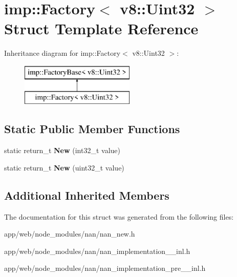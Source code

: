 \hypertarget{structimp_1_1_factory_3_01v8_1_1_uint32_01_4}{}\section{imp\+:\+:Factory$<$ v8\+:\+:Uint32 $>$ Struct Template Reference}
\label{structimp_1_1_factory_3_01v8_1_1_uint32_01_4}
Inheritance diagram for imp\+:\+:Factory$<$ v8\+:\+:Uint32 $>$\+:\begin{figure}[H]
\begin{center}
\leavevmode
\includegraphics[height=2.000000cm]{structimp_1_1_factory_3_01v8_1_1_uint32_01_4}
\end{center}
\end{figure}
\subsection*{Static Public Member Functions}
\begin{DoxyCompactItemize}
\item 
\mbox{\label{structimp_1_1_factory_3_01v8_1_1_uint32_01_4_a02e4688bceb62024264605717c05acf9}} 
static return\+\_\+t {\bfseries New} (int32\+\_\+t value)
\item 
\mbox{\label{structimp_1_1_factory_3_01v8_1_1_uint32_01_4_ac40acbbd3b18c3f7787d8215f1d740b1}} 
static return\+\_\+t {\bfseries New} (uint32\+\_\+t value)
\end{DoxyCompactItemize}
\subsection*{Additional Inherited Members}


The documentation for this struct was generated from the following files\+:\begin{DoxyCompactItemize}
\item 
app/web/node\+\_\+modules/nan/nan\+\_\+new.\+h\item 
app/web/node\+\_\+modules/nan/nan\+\_\+implementation\+\_\+\_\+inl.\+h\item 
app/web/node\+\_\+modules/nan/nan\+\_\+implementation\+\_\+pre\+\_\+\_\+inl.\+h\end{DoxyCompactItemize}
